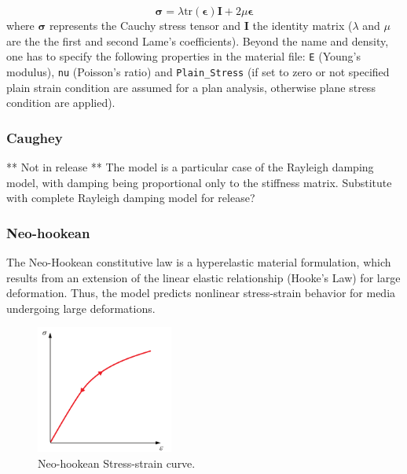\documentclass[a4paper,11pt]{book}
\newcommand{\code}[1]{\texttt{#1}}
\newcommand{\mat}[1]{\ensuremath{\boldsymbol{#1}}}
\begin{document}
\begin{equation}\label{eqn:smm:constitutive_elastic}
  \mat{\sigma } =\lambda\mathrm{tr}(\mat{\epsilon})\mat{I}+2 \mu \mat{\epsilon}
\end{equation}
where $\mat{\sigma}$ represents the Cauchy stress tensor and $\mat{I}$ the identity matrix ($\lambda$ and $\mu$ are the the first  and second Lame's
coefficients). Beyond the name and density, one has to specify the following properties in the material file: \code{E} (Young's modulus), \code{nu} (Poisson's ratio) and \code{Plain\_Stress} (if set to zero or not specified plain strain condition are assumed for a plan analysis, otherwise plane stress condition are applied).

\subsubsection{Caughey}
** Not in release **
The model is a particular case of the Rayleigh damping model, with damping being proportional only to the stiffness matrix. Substitute with complete Rayleigh damping model for release?

\subsubsection{Neo-hookean}
The Neo-Hookean constitutive law is a hyperelastic material formulation, which results from an extension of the linear elastic relationship (Hooke's Law) for large deformation. Thus, the model predicts nonlinear stress-strain behavior for media undergoing large deformations.
 
\begin{figure}[!htb]
  \begin{center}
    \includegraphics[width=0.4\textwidth,keepaspectratio=true]{figures/stress_strain_neo.pdf}
    \caption{Neo-hookean Stress-strain curve.}
    \label{fig:smm:cl:neo_hookean}
  \end{center}
\end{figure}
\end{document}
